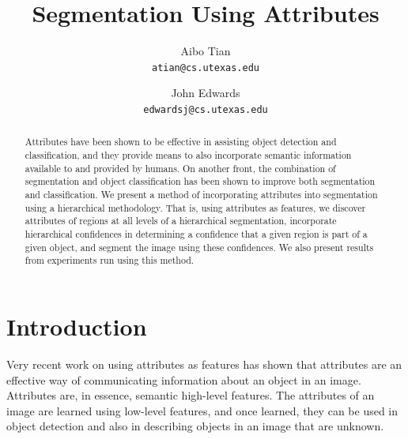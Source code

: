 \documentclass[10pt,twocolumn,letterpaper]{article}
\begin{document}
\title{Segmentation Using Attributes}

\author{Aibo Tian\\
{\tt\small atian@cs.utexas.edu}
\and
John Edwards\\
{\tt\small edwardsj@cs.utexas.edu}
}

\maketitle
\thispagestyle{empty}

\begin{abstract}
Attributes have been shown to be effective in assisting object detection and
classification, and they provide means to also incorporate semantic
information available to and provided by humans.  On another front, the
combination of segmentation and object classification has been shown to
improve both segmentation and classification.  We present a method of incorporating
attributes into segmentation using a hierarchical methodology.
That is, using attributes as features, we discover attributes of regions
at all levels of a hierarchical segmentation, 
incorporate hierarchical confidences in determining a confidence that
a given region is part of a given object, and segment the image using
these confidences.  We also present results from experiments run using
this method.
\end{abstract}

\section{Introduction}
Very recent work on using attributes as features \cite{farhadi09, lampert09}
has shown that attributes are an effective way of communicating information
about an object in an image.  Attributes are, in essence, semantic high-level
features.  The attributes of an image are learned using low-level features,
and once learned, they can be used in object detection and also in describing
objects in an image that are unknown.
\end{document}

